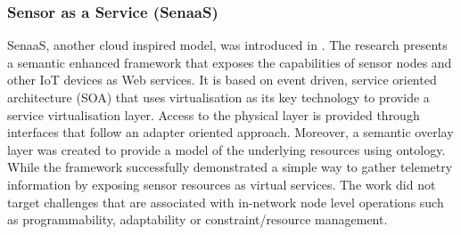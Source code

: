 \subsubsection{Sensor as a Service (SenaaS)}

SenaaS, another cloud inspired model, was introduced in \cite{alam2010virtualizing}. The research presents a semantic enhanced framework that exposes the capabilities of sensor nodes and other IoT devices as Web services. It is based on event driven, service oriented architecture (SOA) that uses virtualisation as its key technology to provide a service virtualisation layer. Access to the physical layer is provided through interfaces that follow an adapter oriented approach. Moreover, a semantic overlay layer was created to provide a model of the underlying resources using ontology.  While the framework successfully demonstrated a simple way to gather telemetry information by exposing sensor resources as virtual services. The work did not target challenges that are associated with in-network node level operations such as programmability, adaptability or constraint/resource management. 

